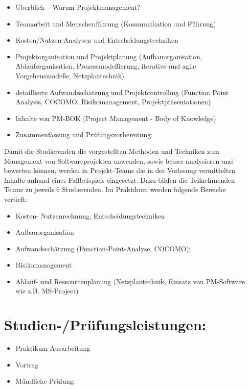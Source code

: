 \begin{itemize}
\item
  Überblick -- Warum Projektmanagement?
\item
  Teamarbeit und Menschenführung (Kommunikation und Führung)
\item
  Kosten/Nutzen-Analysen und Entscheidungstechniken
\item
  Projektorganisation und Projektplanung (Aufbauorganisation,
  Ablauforganisation, Prozessmodellierung, iterative und agile
  Vorgehensmodelle, Netzplantechnik)
\item
  detaillierte Aufwandsschätzung und Projektcontrolling (Function Point
  Analysis, COCOMO, Risikomanagement, Projektpräsentationen)
\item
  Inhalte von PM-BOK (Project Management - Body of Knowledge)
\item
  Zusammenfassung und Prüfungsvorbereitung;
\end{itemize}

Damit die Studierenden die vorgestellten Methoden und Techniken zum
Management von Softwareprojekten anwenden, sowie besser analysieren und
bewerten können, werden in Projekt-Teams die in der Vorlesung
vermittelten Inhalte anhand eines Fallbeispiels eingesetzt. Dazu bilden
die Teilnehmenden Teams zu jeweils 6 Studierenden. Im Praktikum werden
folgende Bereiche vertieft:

\begin{itemize}
\item
  Kosten- Nutzenrechnung, Entscheidungstechniken
\item
  Aufbauorganisation
\item
  Aufwandsschätzung (Function-Point-Analyse, COCOMO);
\item
  Risikomanagement
\item
  Ablauf- und Ressourcenplanung (Netzplantechnik, Einsatz von
  PM-Software wie z.B. MS-Project)
\end{itemize}

\section*{Studien-/Prüfungsleistungen:}\label{studien-pruxfcfungsleistungen-15}

\begin{itemize}
\item
  Praktikum-Ausarbeitung
\item
  Vortrag
\item
  Mündliche Prüfung.
\end{itemize}

